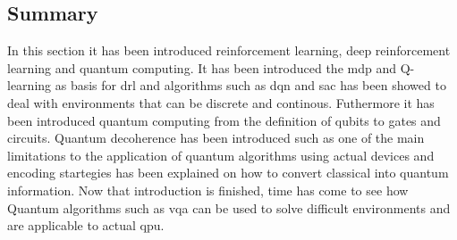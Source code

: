 \subsection{Summary}
In this section it has been introduced reinforcement learning, deep reinforcement learning and quantum computing. It has been introduced the \acrlong{mdp} and Q-learning as basis for \acrlong{drl} and algorithms such as \acrlong{dqn} and \acrlong{sac} has been showed to deal with environments that can be discrete and continous. Futhermore it has been introduced quantum computing from the definition of qubits to gates and circuits. Quantum decoherence has been introduced such as one of the main limitations to the application of quantum algorithms using actual devices and encoding startegies has been explained on how to convert classical into quantum information. Now that introduction is finished, time has come to see how Quantum algorithms such as \acrfull{vqa} can be used to solve difficult environments and are applicable to actual \acrfull{qpu}.
